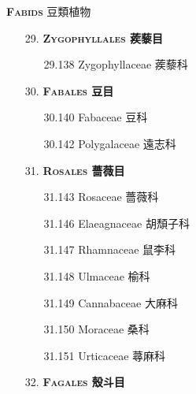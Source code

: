 \noindent \normalsize\textsc{\textbf{Fabids} 豆類植物}\selectfont \\
\footnotesize\selectfont
\begin{enumerate}
  \item[29. ] \textbf{\textsc{Zygophyllales} 蒺藜目}   
    \begin{enumerate}
      \item[29.138] Zygophyllaceae 蒺藜科     
        
    \end{enumerate}
  \item[30. ] \textbf{\textsc{Fabales} 豆目}   
    \begin{enumerate}
      \item[30.140] Fabaceae 豆科     
        
      \item[30.142] Polygalaceae 遠志科     
        
    \end{enumerate}
  \item[31. ] \textbf{\textsc{Rosales} 薔薇目}   
    \begin{enumerate}
      \item[31.143] Rosaceae 薔薇科     
        
      \item[31.146] Elaeagnaceae 胡頹子科     
        
      \item[31.147] Rhamnaceae 鼠李科     
        
      \item[31.148] Ulmaceae 榆科     
        
      \item[31.149] Cannabaceae 大麻科     
        
      \item[31.150] Moraceae 桑科     
        
      \item[31.151] Urticaceae 蕁麻科     
        
    \end{enumerate}
  \item[32. ] \textbf{\textsc{Fagales} 殼斗目}   
    \begin{enumerate}

\end{enumerate}
\end{enumerate}
